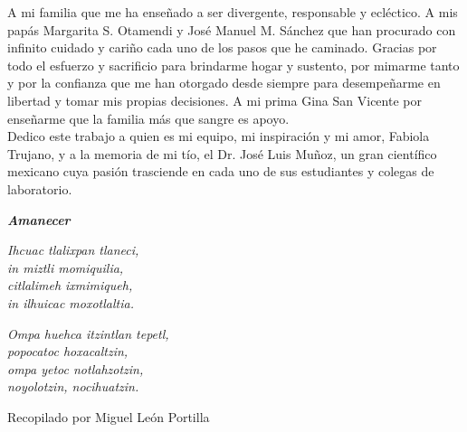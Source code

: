 \newpage

A mi familia que me ha enseñado a ser divergente, responsable y ecléctico. A mis papás Margarita S. Otamendi y José Manuel M. Sánchez que han procurado con infinito cuidado y cariño cada uno de los pasos que he caminado. Gracias por todo el esfuerzo y sacrificio para brindarme hogar y sustento, por mimarme tanto y por la confianza que me han otorgado desde siempre para desempeñarme en libertad y tomar mis propias decisiones. A mi prima Gina San Vicente por enseñarme que la familia más que sangre es apoyo.\\

Dedico este trabajo a quien es mi equipo, mi inspiración y mi amor, Fabiola Trujano, y a la memoria de mi tío, el Dr. José Luis Muñoz, un gran científico mexicano cuya pasión trasciende en cada uno de sus estudiantes y colegas de laboratorio.\\

\vspace{40mm} 

\begin{center}

\textbf{\textit{Amanecer}}\\
\vspace{2mm} 


\textit{Ihcuac tlalixpan tlaneci,}\\
\textit{in miztli momiquilia,}\\
\textit{citlalimeh ixmimiqueh,}\\
\textit{in ilhuicac moxotlaltia.}\\

\vspace{2mm} 

\textit{Ompa huehca itzintlan tepetl,}\\
\textit{popocatoc hoxacaltzin,}\\
\textit{ompa yetoc notlahzotzin,}\\
\textit{noyolotzin, nocihuatzin.}\\

\vspace{2mm}

Recopilado por Miguel León Portilla 

\end{center}